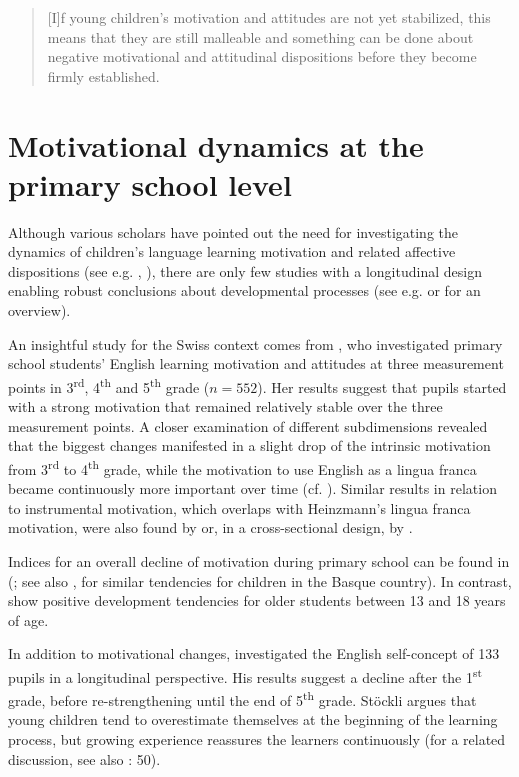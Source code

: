 \documentclass[output=paper]{langsci/langscibook}
\begin{document}
\begin{quote}
[I]f young children’s motivation and attitudes are not yet stabilized, this means that they are still malleable and something can be done about negative motivational and attitudinal dispositions before they become firmly established. \citep[4]{Heinzmann2013}
\end{quote}

\section{Motivational dynamics at the primary school level}\label{sec:08:2}

Although various scholars have pointed out the need for investigating the dynamics of children’s language learning motivation and related affective dispositions (see e.g. \citealt{Cenoz2004}, \citealt{McGroarty2001}), there are only few studies with a longitudinal design enabling robust conclusions about developmental processes (see e.g. \citealt{MihaljevicDjigunovic2012} or \citealt{MihaljevicDjigunovicNikolov2019} for an overview). 

An insightful study for the Swiss context comes from \citet{Heinzmann2013}, who investigated primary school students’ English learning motivation and attitudes at three measurement points in 3\textsuperscript{rd}, 4\textsuperscript{th} and 5\textsuperscript{th} grade ($n=552$). Her results suggest that pupils started with a strong motivation that remained relatively stable over the three measurement points. A closer examination of different subdimensions revealed that the biggest changes manifested in a slight drop of the intrinsic motivation from 3\textsuperscript{rd} to 4\textsuperscript{th} grade, while the motivation to use English as a lingua franca became continuously more important over time (cf. \citealt{Heinzmann2013}). Similar results in relation to instrumental motivation, which overlaps with Heinzmann’s lingua franca motivation, were also found by \citet{Nikolov2002} or, in a cross-sectional design, by \citet[256]{Tragant2006}.

Indices for an overall decline of motivation during primary school can be found in \citeauthor{BaderSchaer2005} (\citeyear{BaderSchaer2005}; see also \citealt{SchaerBader2003}, \citealt{Cenoz2004} for similar tendencies for children in the Basque country). In contrast, \citet[324]{PfenningerSingleton2016} show positive development tendencies for older students between 13 and 18 years of age. 

In addition to motivational changes, \citet[93]{Stoeckli2004} investigated the English self-concept of 133 pupils in a longitudinal perspective. His results suggest a decline after the 1\textsuperscript{st} grade, before re-strengthening until the end of 5\textsuperscript{th} grade. Stöckli argues that young children tend to overestimate themselves at the beginning of the learning process, but growing experience reassures the learners continuously (for a related discussion, see also \citealt{MihaljevicDjigunovicLopriore2011}: 50).
\end{document}

